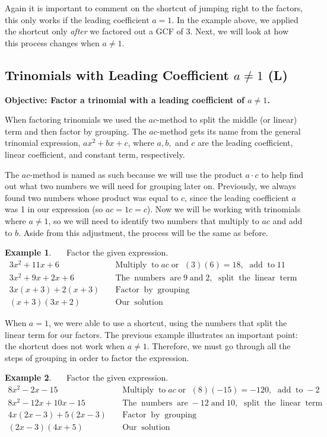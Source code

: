 \documentclass[12pt]{book}
\theoremstyle{definition}
\newtheorem{example}{Example}
\newcommand{\tmop}[1]{\ensuremath{\operatorname{#1}}}
\begin{document}
Again it is important to comment on the shortcut of jumping right to the factors, this only works if the leading coefficient $a=1$. In the example above, we applied the shortcut only {\it after} we factored out a GCF of 3.  Next, we will look at how this process changes when $a\neq 1$.
\subsection{Trinomials with Leading Coefficient $a\neq 1$ (L)}
{\bf Objective: Factor a trinomial with a leading coefficient of $a\neq 1$.}\par
When factoring trinomials we used the $ac$-method to split the middle (or linear) term and then factor by grouping. The $ac$-method gets its name from the general trinomial expression, $a x^2 + b x + c$, where $a, b,$ and $c$ are the leading coefficient, linear coefficient, and constant term, respectively.\par
The $ac$-method is named as such because we will use the product $a \cdot c$ to help find out what two numbers we will need for grouping later on. Previously, we always found two numbers whose product was equal to $c$, since the leading coefficient $a$ was 1 in our expression (so $ac=1c=c$).  Now we will be working with trinomials where $a\neq1$, so we will need to identify two numbers that multiply to $ac$ and add to $b$.  Aside from this adjustment, the process will be the same as before.
\begin{example}~~~Factor the given expression.
  \begin{eqnarray*}
    3 x^2 + 11 x + 6 &  & \tmop{Multiply} \tmop{to} a c \tmop{or~} (3) (6) =
    18, \tmop{~add} \tmop{to} 11\\
    3 x^2 + 9 x + 2 x + 6 &  & \tmop{The} \tmop{numbers} \tmop{are} 9
    \tmop{and} 2, \tmop{~split} \tmop{the} \tmop{linear} \tmop{term}\\
    3 x (x + 3) + 2 (x + 3) &  & \tmop{Factor} \tmop{by} \tmop{grouping}\\
    (x + 3) (3 x + 2) &  & \tmop{Our} \tmop{solution}
  \end{eqnarray*}
\end{example}
When $a = 1$, we were able to use a shortcut, using the numbers that split the linear term for our factors. The previous example illustrates an important point: the shortcut does not work when $a \neq 1$.  Therefore, we must go through all the steps of grouping in order to factor the expression.
\begin{example}~~~Factor the given expression.
  \begin{eqnarray*}
    8 x^2 - 2 x - 15 &  & \tmop{Multiply} \tmop{to} a c \tmop{or~} (8) (- 15) =
    - 120, \tmop{~add} \tmop{to} - 2\\
    8 x^2 - 12 x + 10 x - 15 &  & \tmop{The} \tmop{numbers} \tmop{are} - 12
    \tmop{and} 10, \tmop{~split} \tmop{the} \tmop{linear} \tmop{term}\\
    4 x (2 x - 3) + 5 (2 x - 3) &  & \tmop{Factor} \tmop{by} \tmop{grouping}\\
    (2 x - 3) (4 x + 5) &  & \tmop{Our} \tmop{solution}
  \end{eqnarray*}
\end{example}
\end{document}
